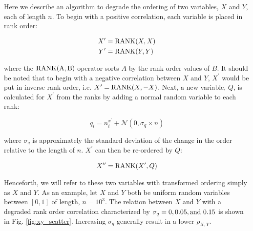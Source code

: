 \documentclass[a4paper,fleqn,usenatbib]{mnras}
\begin{document}
Here we describe an algorithm to degrade the ordering of two variables, $X$ and $Y$, each of length $n$.  To begin with a positive correlation, each variable is placed in rank order:  
%
\begin{linenomath}
\begin{align}
X^{\prime} &= {\rm RANK}(X,X) \nonumber \\
Y^{\prime} &= {\rm RANK}(Y,Y) 
\end{align}
\end{linenomath}
%
where the ${\rm RANK(A,B)}$ operator sorts $A$ by the rank order values of $B$.  It should be noted that to begin with a negative correlation between $X$ and $Y$, $X^{\prime}$ would be put in inverse rank order, i.e. $X^{\prime} = {\rm RANK}(X,-X)$.  Next, a new variable, $Q$, is calculated for $X^{\prime}$ from the ranks by adding a normal random variable to each rank:   
%
\begin{linenomath}
\begin{equation}
q_i = n^{x^{\prime}}_i + \mathcal{N}(0, \sigma_q \times n)
\end{equation}
\end{linenomath}
%
where $\sigma_q$ is approximately the standard deviation of the change in the order relative to the length of $n$.  $X^{\prime}$ can then be re-ordered by $Q$:
%
\begin{linenomath}
\begin{equation}
X^{\prime\prime}  = {\rm RANK}(X^{\prime}, Q)
\end{equation}
\end{linenomath}
%
Henceforth, we will refer to these two variables with transformed ordering simply as $X$ and $Y$.  As an example, let $X$ and $Y$ both be uniform random variables between $[0,1]$ of length, $n=10^3$.  The relation between $X$ and $Y$ with a degraded rank order correlation characterized by $\sigma_q=0, 0.05, {\rm and}~ 0.15$ is shown in Fig. \ref{fig:xy_scatter}.  Increasing $\sigma_q$ generally result in a lower $\rho_{X,Y}$.
\end{document}
